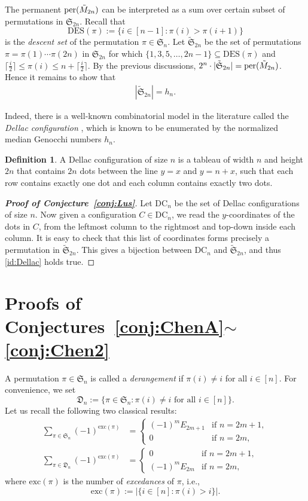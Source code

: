 \documentclass[11pt,reqno]{amsart}
\numberwithin{equation}{section}
\theoremstyle{plain}
\theoremstyle{definition}
\newtheorem{Def}[theorem]{Definition}
\renewcommand{\S}{\mathfrak{S}}
\def\exc{\mathrm{exc}}
\def\per{\mathrm{per}}
\def\DES{\mathrm{DES}}
\newcommand{\D}{\mathfrak{D}}
\def\per{{\rm per}}
\begin{document}
The permanent $\per(\tilde{M}_{2n})$ can be interpreted as a sum over certain subset of permutations in $\S_{2n}$. Recall that $$\DES(\pi):=\{i\in[n-1]:\pi(i)>\pi(i+1)\}$$ is the {\it descent set} of the permutation $\pi\in\S_n$. Let $\tilde{\S}_{2n}$ be the set of permutations $\pi=\pi(1)\cdots\pi(2n)$ in $\S_{2n}$ for which $\{1,3,5,\ldots,2n-1\}\subseteq \DES(\pi)$ and
 $\lceil\frac{i}{2}\rceil\le \pi(i)\le n+\lceil\frac{i}{2}\rceil$.
By the previous discussions, $2^n\cdot|\tilde{\S}_{2n}|=\per(\tilde{M}_{2n})$. Hence it remains to show that
\begin{align}\label{id:Dellac}
|\tilde{\S}_{2n}|=h_n.
\end{align}

Indeed, there is a well-known combinatorial model in the literature called the {\it Dellac configuration} \cite{HZ,Big}, which is known \cite{Fei} to be enumerated by the normalized median Genocchi numbers $h_n$.

\begin{Def}
A Dellac configuration of size $n$ is a tableau of width $n$ and height $2n$ that contains $2n$ dots between the line $y=x$ and $y=n+x$, such that each row contains exactly one dot and each column contains exactly two dots.
\end{Def}

\begin{proof}[{\bf Proof of Conjecture~\ref{conj:Lus}}]
Let $\mathrm{DC}_n$ be the set of Dellac configurations of size $n$. Now given a configuration $C\in \mathrm{DC}_n$, we read the $y$-coordinates of the dots in $C$, from the leftmost column to the rightmost and top-down inside each column. It is easy to check that this list of coordinates forms precisely a permutation in $\tilde{\S}_{2n}$. This gives a bijection between $\mathrm{DC}_n$ and $\tilde{\S}_{2n}$, and thus \eqref{id:Dellac} holds true.
\end{proof}


\section{Proofs of Conjectures~\ref{conj:ChenA}\texorpdfstring{$\sim$}{}\ref{conj:Chen2}}\label{sec:conj of chen}

A permutation $\pi\in\S_n$ is called a {\it derangement} if $\pi(i)\not=i$ for all $i\in[n]$.
For convenience, we set
$$\D_n :=\{\pi\in\S_n:\pi(i)\neq i\text{ for all }i\in[n]\}. $$
Let us recall the following two classical results:
\begin{align}
\label{Euler-sign}
\sum_{\pi\in\S_n}(-1)^{\exc(\pi)}&=\begin{cases}
(-1)^mE_{2m+1} & \text{if $n=2m+1$},\\
0 & \text{if $n=2m$},
\end{cases}\\
\label{Roselle-sign}
\sum_{\pi\in\D_n}(-1)^{\exc(\pi)}&=\begin{cases}
0 & \text{if $n=2m+1$},\\
(-1)^mE_{2m} & \text{if $n=2m$},
\end{cases}
\end{align}
where $\exc(\pi)$ is the number of {\it excedances} of $\pi$, i.e.,
$$
\exc(\pi) :=|\{i\in [n]:\pi(i)>i\}|.
$$
\end{document}

